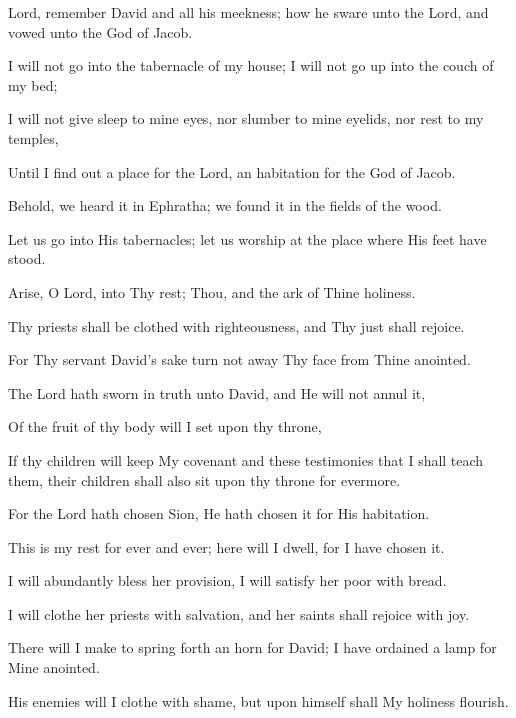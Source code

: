 Lord, remember David and all his meekness; how he sware unto the Lord, and vowed unto the God of Jacob.

I will not go into the tabernacle of my house; I will not go up into the couch of my bed;

I will not give sleep to mine eyes, nor slumber to mine eyelids, nor rest to my temples,

Until I find out a place for the Lord, an habitation for the God of Jacob.

Behold, we heard it in Ephratha; we found it in the fields of the wood.

Let us go into His tabernacles; let us worship at the place where His feet have stood.

Arise, O Lord, into Thy rest; Thou, and the ark of Thine holiness.

Thy priests shall be clothed with righteousness, and Thy just shall rejoice.

For Thy servant David's sake turn not away Thy face from Thine anointed.

The Lord hath sworn in truth unto David, and He will not annul it,

Of the fruit of thy body will I set upon thy throne,

If thy children will keep My covenant and these testimonies that I shall teach them, their children shall also sit upon thy throne for evermore.

For the Lord hath chosen Sion, He hath chosen it for His habitation.

This is my rest for ever and ever; here will I dwell, for I have chosen it.

I will abundantly bless her provision, I will satisfy her poor with bread.

I will clothe her priests with salvation, and her saints shall rejoice with joy.

There will I make to spring forth an horn for David; I have ordained a lamp for Mine anointed.

His enemies will I clothe with shame, but upon himself shall My holiness flourish.
